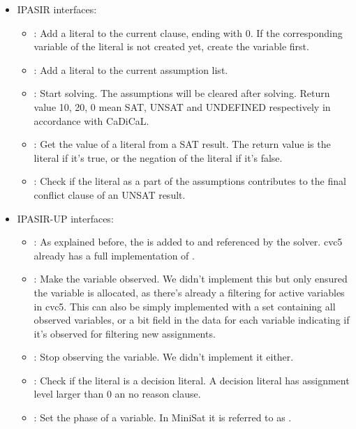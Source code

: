 \begin{itemize}
  \item IPASIR interfaces:
  \begin{itemize}
    \item {}: Add a literal to the current clause, ending with 0. If the corresponding variable of the literal is not created yet, create the variable first.
    \item {}: Add a literal to the current assumption list.
    \item {}: Start solving. The assumptions will be cleared after solving. Return value 10, 20, 0 mean SAT, UNSAT and UNDEFINED respectively in accordance with CaDiCaL.
    \item {}: Get the value of a literal from a SAT result. The return value is the literal if it's true, or the negation of the literal if it's false.
    \item {}: Check if the literal as a part of the assumptions contributes to the final conflict clause of an UNSAT result.
  \end{itemize}
  \item IPASIR-UP interfaces:
  \begin{itemize}
    \item {}: As explained before, the  is added to and referenced by the solver. cvc5 already has a full implementation of .
    \item {}: Make the variable observed. We didn't implement this but only ensured the variable is allocated, as there's already a filtering for active variables in cvc5. This can also be simply implemented with a set containing all observed variables, or a bit field in the data for each variable indicating if it's observed for filtering new assignments.
    \item {}: Stop observing the variable. We didn't implement it either.
    \item {}: Check if the literal is a decision literal. A decision literal has assignment level larger than 0 an no reason clause.
    \item {}: Set the phase of a variable. In MiniSat it is referred to as .
  \end{itemize}

\end{itemize}
